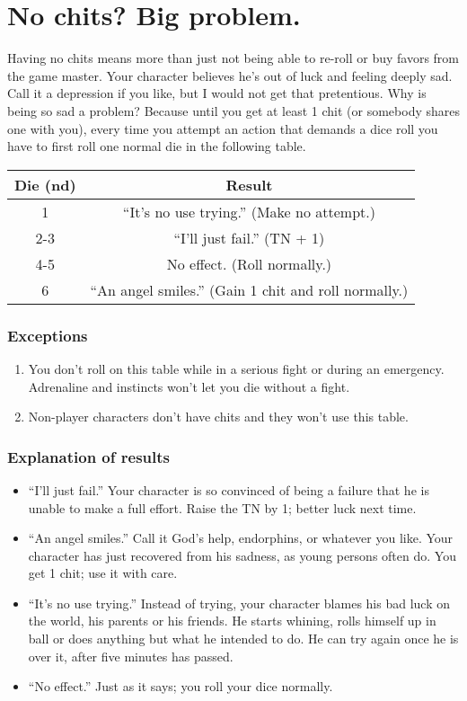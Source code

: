 \section{No chits? Big problem.}

Having no chits means more than just not being able to re-roll or
buy favors from the game master. Your character believes he's out
of luck and feeling deeply sad. Call it a depression if you like,
but I would not get that pretentious. Why is being so sad a problem?
Because until you get at least 1 chit (or somebody shares one with
you), every time you attempt an action that demands a dice roll you
have to first roll one normal die in the following table.

\begin{longtable}{cc}
\hline
\toprule 
Die (nd) & Result\tabularnewline
\midrule
\hline
\endhead
\midrule 
1 & ``It's no use trying.'' (Make no attempt.)\tabularnewline
\midrule 
2-3 & ``I'll just fail.'' (TN + 1)\tabularnewline
\midrule 
4-5 & No effect. (Roll normally.)\tabularnewline
\midrule 
6  & ``An angel smiles.'' (Gain 1 chit and roll normally.)\tabularnewline
\bottomrule
\end{longtable}


\subsubsection*{Exceptions}
\begin{enumerate}
\item You don't roll on this table while in a serious fight or during an
emergency. Adrenaline and instincts won't let you die without a fight.
\item Non-player characters don't have chits and they won't use this table. 
\end{enumerate}

\subsubsection*{Explanation of results}
\begin{itemize}
\item ``I'll just fail.'' Your character is so convinced of being a failure
that he is unable to make a full effort. Raise the TN by 1; better
luck next time.
\item ``An angel smiles.'' Call it God's help, endorphins, or whatever
you like. Your character has just recovered from his sadness, as young
persons often do. You get 1 chit; use it with care.
\item ``It's no use trying.'' Instead of trying, your character blames
his bad luck on the world, his parents or his friends. He starts whining,
rolls himself up in ball or does anything but what he intended to
do. He can try again once he is over it, after five minutes has passed.
\item ``No effect.'' Just as it says; you roll your dice normally. \vfill{}

\end{itemize}
\begin{center}
\vfill{}

\par\end{center}
